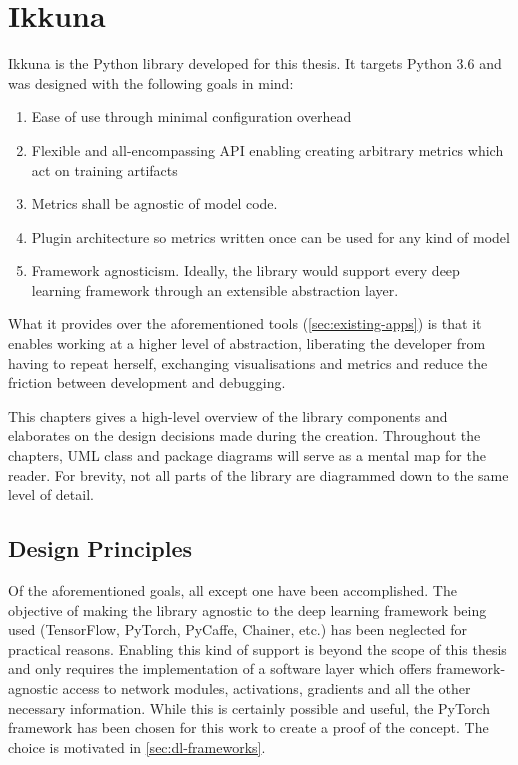 \hypertarget{ikkuna}{%
\chapter{Ikkuna}\label{ikkuna}}

Ikkuna is the Python library developed for this thesis. It targets
Python 3.6 and was designed with the following goals in mind:

\begin{enumerate}
    \item
        Ease of use through minimal configuration overhead
    \item
        Flexible and all-encompassing API enabling creating arbitrary metrics
        which act on training artifacts
    \item
        Metrics shall be agnostic of model code.
    \item
        Plugin architecture so metrics written once can be used for any kind
        of model
    \item
        Framework agnosticism. Ideally, the library would support every deep
        learning framework through an extensible abstraction layer.
\end{enumerate}

What it provides over the aforementioned tools (\cref{sec:existing-apps}) is that it enables
working at a higher level of abstraction, liberating the developer from
having to repeat herself, exchanging visualisations and metrics and
reduce the friction between development and debugging.

This chapters gives a
high-level overview of the library components and elaborates on the design
decisions made during the creation. Throughout the chapters, UML class and
package diagrams will serve as a mental map for the reader. For brevity, not all
parts of the library are diagrammed down to the same level of detail.

\hypertarget{design-principles}{%
\section{Design Principles}\label{design-principles}}

Of the aforementioned goals, all except one have been accomplished. The
objective of making the library agnostic to the deep learning framework
being used (TensorFlow, PyTorch, PyCaffe, Chainer, etc.) has been
neglected for practical reasons. Enabling this kind of support is beyond
the scope of this thesis and only requires the implementation of a
software layer which offers framework-agnostic access to network
modules, activations, gradients and all the other necessary information.
While this is certainly possible and useful, the PyTorch framework has
been chosen for this work to create a proof of the concept. The choice is
motivated in \cref{sec:dl-frameworks}.

